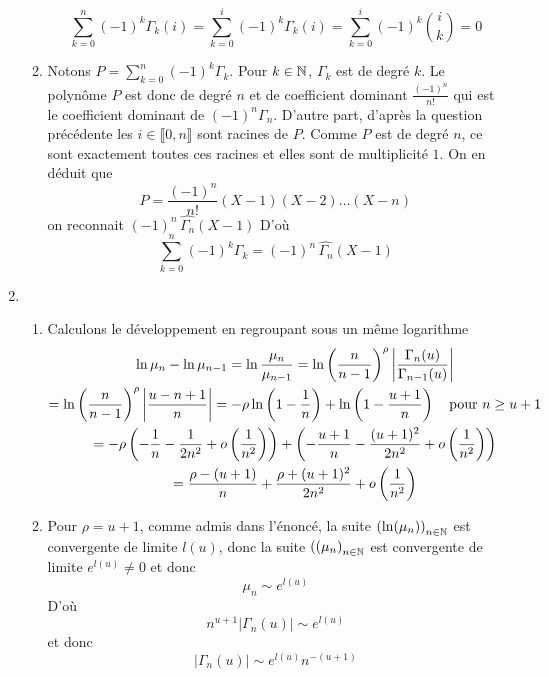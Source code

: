 \begin{enumerate}
\begin{enumerate}
\begin{displaymath}
 \sum_{k=0}^n(-1)^k\Gamma_k(i)=\sum_{k=0}^i(-1)^k\Gamma_k(i)=\sum_{k=0}^i (-1)^k\binom{i}{k}=0 
\end{displaymath}
\item Notons $P= \sum_{k=0}^n(-1)^k\Gamma_k$. Pour $k\in \mathbb{N}$, $\Gamma_k$ est de degré $k$. Le polynôme $P$ est donc de degré $n$ et de coefficient dominant $\frac{(-1)^n}{n!}$ qui est le coefficient dominant de $(-1)^n\Gamma_n$.\newline
D'autre part, d'après la question précédente les $i\in\llbracket 0, n\rrbracket$ sont racines de $P$. Comme $P$ est de degré $n$, ce sont exactement toutes ces racines et elles sont de multiplicité $1$.\newline
On en déduit que $$P=\frac{(-1)^n}{n!}(X-1)(X-2)\dots(X-n)$$ on reconnait $(-1)^n \,\widehat{\Gamma_n}(X-1)$ D'où
\begin{displaymath}
 \sum_{k=0}^n(-1)^k\Gamma_k = (-1)^n \,\widehat{\Gamma_n}(X-1)
\end{displaymath}
\end{enumerate}
\item
\begin{enumerate}
\item Calculons le développement en regroupant sous un même logarithme
\begin{multline*}
\ln\mu_n-\ln \mu_{n-1} = \ln\frac{\mu_n}{\mu_{n-1}} 
 = \ln\left(\frac n{n-1}\right)^ \rho\left|\frac{\Gamma_n(u)}{\Gamma_{n-1}(u)}\right|\\
= \ln\left(\frac n{n-1}\right)^ \rho\left|\frac{u-n+1}{n}\right|
= -\rho\ln\left(1-\frac 1n\right)+\ln\left(1-\frac{u+1}n\right)\quad\text{pour}\ n\geq u+1\\
= -\rho\left(-\frac 1n-\frac{1}{2n^2} +o\left(\frac1{n^2}\right)\right)+ \left(-\frac {u+1}n-\frac{(u+1)^2}{2n^2} +o\left(\frac1{n^2}\right)\right)\\
= \frac {\rho-(u+1)}n+\frac{\rho+(u+1)^2}{2n^2} +o\left(\frac1{n^2}\right)
\end{multline*}

\item Pour $\rho=u+1$, comme admis dans l'énoncé, la suite $\left( \ln(\mu_n)\right) _{n\in \mathbb{N}}$ est convergente de limite $l(u)$, donc la suite $\left((\mu_n\right) _{n\in \mathbb{N}}$ est convergente de limite $e^{l(u)}\neq 0$ et donc $$\mu_n\sim e^{l(u)}$$
D'où
$$n^{u+1} \left|\Gamma_n(u)\right|\sim e^{l(u)}$$
et donc
$$ \left|\Gamma_n(u)\right|\sim e^{l(u)}n^{-(u+1)}$$


\end{enumerate}
\end{enumerate}
